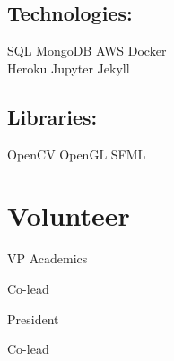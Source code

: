 \documentclass[]{deedy-resume-openfont}
\begin{document}
\begin{minipage}[t]{0.33\textwidth}
\subsection{Technologies:}
SQL \textbullet{} MongoDB \textbullet{} AWS \textbullet{} Docker\\
Heroku \textbullet{} Jupyter \textbullet{} Jekyll \\
\sectionsep
\subsection{Libraries:}
OpenCV \textbullet{} OpenGL \textbullet{} SFML \\
\sectionsep
\section{Volunteer}
\sectionsep
\begin{tightemize}\item
VP Academics
\end{tightemize}
\begin{tightemize}\item
Co-lead
\end{tightemize}
\sectionsep
{}
\begin{tightemize}\item
President
\end{tightemize}
\sectionsep
{}
\begin{tightemize}
\item Co-lead
\end{tightemize}
\sectionsep
%
%
\end{minipage} 
\hfill
\end{document}
